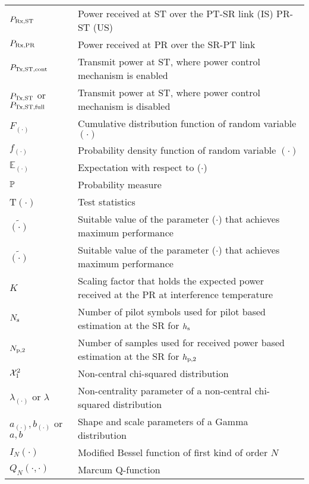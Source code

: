 \begin{longtable}{p{}p{}}


	$P_{\text{Rx,ST}}$  		&	Power received at ST over the PT-SR link (IS) PR-ST (US) \\ 
	$P_{\text{Rx,PR}}$  		&	Power received at PR over the SR-PT link \\

	$P_{\text{Tx,ST,cont}}$	  		&  	Transmit power at ST, where power control mechanism is enabled	\\
	$P_{\text{Tx,ST}}$ or $P_{\text{Tx,ST,full}}$	 	&  	Transmit power at ST, where power control mechanism is disabled	\\
	
       $F_{(\cdot)}$           &       Cumulative distribution function of random variable $(\cdot)$ \\
       $f_{(\cdot)}$           &       Probability density function of random variable $(\cdot)$ \\
       $\mathbb E_{(\cdot)}$   &       Expectation with respect to ($\cdot$) \\
       $\mathbb P$                    &       Probability measure \\
       T$(\cdot)$  	       &       Test statistics \\
       $\tilde{(\cdot)}$       &       Suitable value of the parameter ($\cdot$) that achieves maximum performance \\
       $\tilde{(\cdot)}$       &       Suitable value of the parameter ($\cdot$) that achieves maximum performance \\
       $K$                     &       Scaling factor that holds the expected power received at the PR at interference temperature  \\
       $N_{\text{s}}$                   &       Number of pilot symbols used for pilot based estimation at the SR for $h_{\text{s}}$ \\
       $N_{\text{p,2}}$                   &       Number of samples used for received power based estimation at the SR for $h_{\text{p,2}}$ \\
       $\ncchi2$               &       Non-central chi-squared distribution \\
       $\lambda_{(\cdot)}$ or $\lambda$       &       Non-centrality parameter of a non-central chi-squared distribution \\
       $a_{(\cdot)}, b_{(\cdot)}$ or $a, b$       &       Shape and scale parameters of a Gamma distribution \\

       $I_{N}(\cdot)$	       &	Modified Bessel function of first kind of order $N$ \\		
       $Q_{N}(\cdot, \cdot)$	       &	Marcum Q-function \\		
\end{longtable}
  



